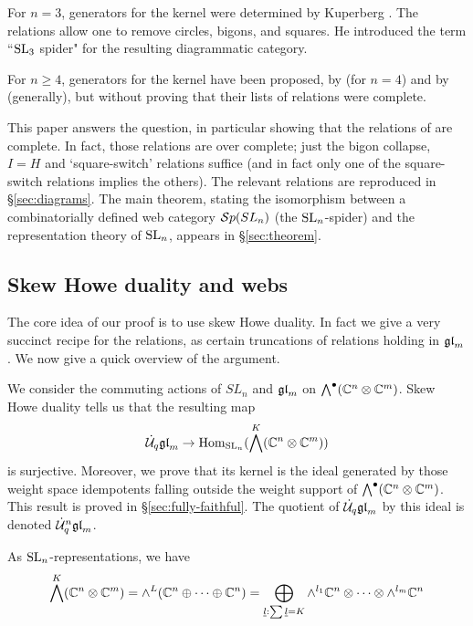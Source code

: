 \documentclass[11pt,leqno]{article}
\begin{document}
For $n=3$, generators for the kernel were determined by Kuperberg \cite{MR1403861}.  The relations allow one to remove circles, bigons, and squares.  He introduced the term ``${\rm{SL}}_3$ spider" for the resulting diagrammatic category.

For $n \geq 4$, generators for the kernel have been proposed, by \cite{math.QA/0310143} (for $n=4$) and by \cite{0704.1503} (generally), but without proving that their lists of relations were complete.

This paper answers the question, in particular showing that the relations of \cite{0704.1503} are complete. In fact, those relations are over complete; just the bigon collapse, $I=H$ and `square-switch' relations suffice (and in fact only one of the square-switch relations implies the others). The relevant relations are reproduced in \S\ref{sec:diagrams}.
The main theorem, stating the isomorphism between a combinatorially defined web category ${\mathcal{S}p}(SL_n)$ (the ${\rm{SL}}_n $-spider) and the representation theory of ${\rm{SL}}_n$, appears in \S \ref{sec:theorem}.


\subsection{Skew Howe duality and webs}
The core idea of our proof is to use skew Howe duality.  In fact we give a very succinct recipe for the relations, as certain truncations of relations holding in ${\mathfrak{gl}}_m$.  We now give a quick overview of the argument.

We consider the commuting actions of $ SL_n $ and $ {\mathfrak{gl}}_m $ on $\bigwedge^\bullet(\mathbb{C}^n \otimes \mathbb{C}^m)$.  Skew Howe duality tells us that the resulting map
\begin{equation}
\dot{{\mathcal{U}}}_q{\mathfrak{gl}}_m \rightarrow \operatorname{Hom}_{{\rm{SL}}_n}(\bigwedge^K(\mathbb{C}^n \otimes \mathbb{C}^m))
\end{equation}
is surjective.  Moreover, we prove that its kernel is the ideal generated by those weight space idempotents falling outside the weight support of $\bigwedge^\bullet(\mathbb C^n \otimes \mathbb C^m)$.  This result is proved in \S \ref{sec:fully-faithful}.  The quotient of $ \dot{{\mathcal{U}}}_q{\mathfrak{gl}}_m $ by this ideal is denoted $\dot{{\mathcal{U}}}_q^n{\mathfrak{gl}}_m$.

As ${\rm{SL}}_n$-representations, we have
\begin{equation*}
\bigwedge^K(\mathbb C^n \otimes \mathbb C^m)  = \wedge^L(\mathbb C^n \oplus \cdots \oplus \mathbb C^n)
         = \bigoplus_{\underline{l}: \sum \underline{l} = K} \wedge^{l_1} \mathbb C^n \otimes \cdots \otimes \wedge^{l_m} \mathbb C^n
\end{equation*}
\end{document}
